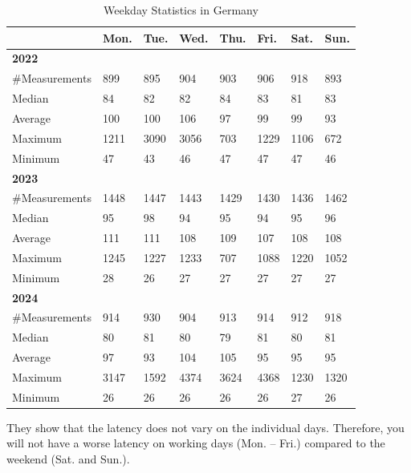 \begin{table}
	\caption{Weekday Statistics in Germany}
	\label{fig:weekday-statistics}
	\begin{tabular}{llllllll}
		\toprule
		               & Mon. & Tue. & Wed. & Thu. & Fri. & Sat. & Sun. \\
		\midrule
		\textbf{2022}  &      &      &      &      &      &      &      \\
		\#Measurements & 899  & 895  & 904  & 903  & 906  & 918  & 893  \\
		Median         & 84   & 82   & 82   & 84   & 83   & 81   & 83   \\
		Average        & 100  & 100  & 106  & 97   & 99   & 99   & 93   \\
		Maximum        & 1211 & 3090 & 3056 & 703  & 1229 & 1106 & 672  \\
		Minimum        & 47   & 43   & 46   & 47   & 47   & 47   & 46   \\
		\midrule
		\textbf{2023}  &      &      &      &      &      &      &      \\
		\#Measurements & 1448 & 1447 & 1443 & 1429 & 1430 & 1436 & 1462 \\
		Median         & 95   & 98   & 94   & 95   & 94   & 95   & 96   \\
		Average        & 111  & 111  & 108  & 109  & 107  & 108  & 108  \\
		Maximum        & 1245 & 1227 & 1233 & 707  & 1088 & 1220 & 1052 \\
		Minimum        & 28   & 26   & 27   & 27   & 27   & 27   & 27   \\
		\midrule
		\textbf{2024}  &      &      &      &      &      &      &      \\
		\#Measurements & 914  & 930  & 904  & 913  & 914  & 912  & 918  \\
		Median         & 80   & 81   & 80   & 79   & 81   & 80   & 81   \\
		Average        & 97   & 93   & 104  & 105  & 95   & 95   & 95   \\
		Maximum        & 3147 & 1592 & 4374 & 3624 & 4368 & 1230 & 1320 \\
		Minimum        & 26   & 26   & 26   & 26   & 26   & 27   & 26   \\
		\bottomrule
	\end{tabular}
\end{table}

They show that the latency does not vary on the individual days. Therefore, you
will not have a worse latency on working days (Mon. -- Fri.) compared to the
weekend (Sat. and Sun.).

